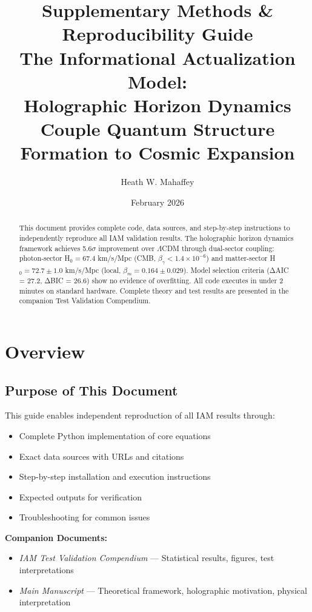 \documentclass[11pt]{article}
\title{\textbf{Supplementary Methods \& Reproducibility Guide} \\ 
\large The Informational Actualization Model: \\
Holographic Horizon Dynamics Couple Quantum Structure Formation to Cosmic Expansion}
\author{Heath W. Mahaffey}
\date{February 2026}
\begin{document}
\maketitle

\begin{abstract}
This document provides complete code, data sources, and step-by-step instructions to independently reproduce all IAM validation results. The holographic horizon dynamics framework achieves 5.6$\sigma$ improvement over $\Lambda$CDM through dual-sector coupling: photon-sector H$_0 = 67.4$ km/s/Mpc (CMB, $\beta_\gamma < 1.4 \times 10^{-6}$) and matter-sector H$_0 = 72.7 \pm 1.0$ km/s/Mpc (local, $\beta_m = 0.164 \pm 0.029$). Model selection criteria (ΔAIC = 27.2, ΔBIC = 26.6) show no evidence of overfitting. All code executes in under 2 minutes on standard hardware. Complete theory and test results are presented in the companion Test Validation Compendium.
\end{abstract}

\tableofcontents
\newpage

\section{Overview}

\subsection{Purpose of This Document}

This guide enables independent reproduction of all IAM results through:
\begin{itemize}
    \item Complete Python implementation of core equations
    \item Exact data sources with URLs and citations
    \item Step-by-step installation and execution instructions
    \item Expected outputs for verification
    \item Troubleshooting for common issues
\end{itemize}

\noindent\textbf{Companion Documents:}
\begin{itemize}
    \item \textit{IAM Test Validation Compendium} — Statistical results, figures, test interpretations
    \item \textit{Main Manuscript} — Theoretical framework, holographic motivation, physical interpretation
\end{itemize}
\end{document}

